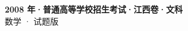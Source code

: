 \documentclass[zihao=-4, a4paper]{ctexart}
\begin{document}
\begin{center}
  {\Large\bfseries 2008 年·普通高等学校招生考试·江西卷·文科}\\[4pt]
  {\large 数学 · 试题版}
\end{center}
\medskip
{}

\end{document}
